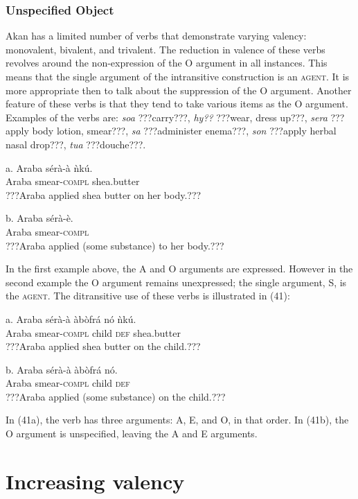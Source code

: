 \documentclass[output=paper]{langsci/langscibook}
\begin{document}
\subsubsection{Unspecified Object}

Akan has a limited number of verbs that demonstrate varying valency: monovalent, bivalent, and trivalent. The reduction in valence of these verbs revolves around the non-expression of the O argument in all instances. This means that the single argument of the intransitive construction is an \textsc{agent}. It is more appropriate then to talk about the suppression of the O argument. Another feature of these verbs is that they tend to take various items as the O argument. Examples of the verbs are: \emph{soa} ???carry???, \emph{hy??} ???wear, dress up???, \emph{sera} ???apply body lotion, smear???, \emph{sa} ???administer enema???, \emph{son} ???apply herbal nasal drop???, \emph{tua} ???douche???.


\ea
\gll a.  Araba  sérà-à    ǹkú.\\
       Araba  smear-\textsc{compl}  shea.butter\\
\glt ???Araba applied shea butter on her body.???
\z

\ea
\gll  b.  Araba  sérà-è.\\
       Araba  smear-\textsc{compl}\\
\glt ???Araba applied (some substance) to her body.???
\z

In the first example above, the A and O arguments are expressed. However in the second example the O argument remains unexpressed; the single argument, S, is the \textsc{agent}. The ditransitive use of these verbs is illustrated in (41):

\ea
\gll a.  Araba  sérà-à    àbòfrá  nó  ǹkú.\\
       Araba  smear-\textsc{compl}  child  \textsc{def}  shea.butter\\
\glt ???Araba applied shea butter on the child.???
\z

\ea
\gll  b.  Araba  sérà-à    àbòfrá  nó.\\
       Araba  smear-\textsc{compl}  child  \textsc{def}\\
\glt ???Araba applied (some substance) on the child.???
\z

In (41a), the verb has three arguments: A, E, and O, in that order. In (41b), the O argument is unspecified, leaving the A and E arguments.

\section{Increasing valency}
\end{document}

